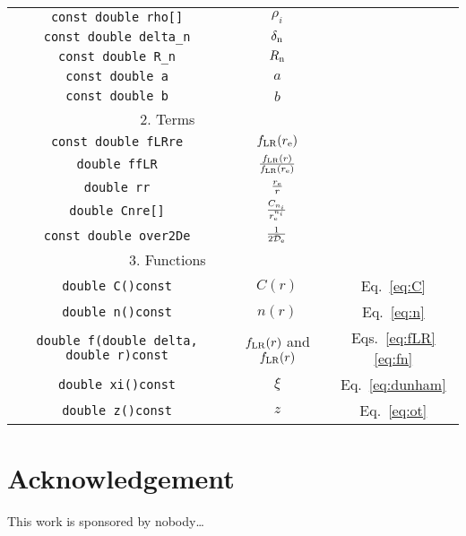 \documentclass[12pt,twoside,a4paper,hidelinks]{article}
\begin{document}
\begin{table}[hp]
\begin{tabular}{ccc}
		         \verb|const double rho[]|           &                   $\rho_i$                    &                             \\
		        \verb|const double delta_n|          &               $\delta_{\rm n}$                &                             \\
		          \verb|const double R_n|            &                  $R_{\rm n}$                  &                             \\
		           \verb|const double a|             &                      $a$                      &                             \\
		           \verb|const double b|             &                      $b$                      &                             \\ \hline
		                                \multicolumn{2}{c}{2. Terms}                                 &                             \\ \hline
		      \verb|const double fLRre|        &            $f_{\rm LR}(r_{\rm e})$            &                             \\
		             \verb|double ffLR|              & $\frac{f_{\rm LR}(r)}{f_{\rm LR}(r_{\rm e})}$ &                             \\
		              \verb|double rr|               &             $\frac{r_{\rm e}}{r}$             &                             \\
		            \verb|double Cnre[]|             &       $\frac{C_{n_i}}{r_{\rm e}^{n_i}}$       &                             \\
		       \verb|const double over2De|        &       $\frac{1}{2\mathcal{D}_{\rm e}}$        &                             \\
		                              \multicolumn{2}{c}{3. Functions}                               &                             \\
		           \verb|double C()const|            &                    $C(r)$                     &        Eq.~\eqref{eq:C}         \\
		           \verb|double n()const|            &                    $n(r)$                     &        Eq.~\eqref{eq:n}         \\
		\verb|double f(double delta, double r)const| &      $f_{\rm LR}(r)$ and $f_{\rm LR}(r)$      & Eqs.~\eqref{eq:fLR}\eqref{eq:fn} \\
		          \verb|double xi()const|            &                     $\xi$                     &      Eq.~\eqref{eq:dunham}      \\
		           \verb|double z()const|            &                      $z$                      &        Eq.~\eqref{eq:ot}        \\ \hline\hline
	\end{tabular}
\end{table}
\section*{Acknowledgement}\label{sec:acknowledge}

This work is sponsored by nobody\ldots






\newpage
\end{document}
